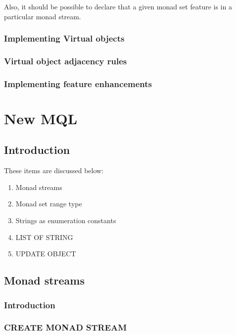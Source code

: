 \documentclass[a4paper,12pt]{article}
\begin{document}
Also, it should be possible to declare that a given monad set feature
is in a particular monad stream.


\subsubsection{Implementing Virtual objects}

\subsubsection{Virtual object adjacency rules}

\subsubsection{Implementing feature enhancements}

\section{New MQL}

\subsection{Introduction}

These items are discussed below:

\begin{enumerate}
\item Monad streams
\item Monad set range type
\item Strings as enumeration constants
\item LIST OF STRING
\item UPDATE OBJECT
\end{enumerate}

\subsection{Monad streams}\label{sec:MonadStreams}

\subsubsection{Introduction}

\subsubsection{CREATE MONAD STREAM}
\end{document}
